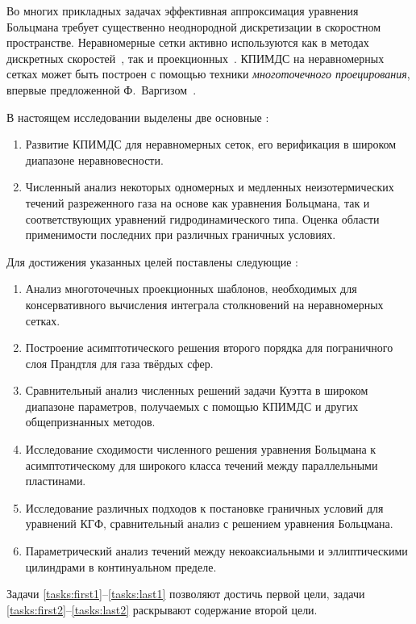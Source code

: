 Во многих прикладных задачах эффективная аппроксимация уравнения Больцмана
требует существенно неоднородной дискретизации в скоростном пространстве.
Неравномерные сетки активно используются
как в методах дискретных скоростей~\autocite{Kolobov2011, Morris2012},
так и проекционных~\autocite{Heintz2008, Wu2014}.
КПИМДС на неравномерных сетках может быть построен с помощью техники \emph{многоточечного проецирования},
впервые предложенной Ф.~Варгизом~\autocite{Varghese2007}.

В настоящем исследовании выделены две основные {\aim}:
\begin{enumerate}
    \item Развитие КПИМДС для неравномерных сеток, его верификация в широком диапазоне неравновесности.
    \item Численный анализ некоторых одномерных и медленных неизотермических течений разреженного газа
    на основе как уравнения Больцмана, так и соответствующих уравнений гидродинамического типа.
    Оценка области применимости последних при различных граничных условиях.
\end{enumerate}
Для достижения указанных целей поставлены следующие {\tasks}:
\begin{enumerate}
    \item Анализ многоточечных проекционных шаблонов, необходимых для консервативного вычисления
    интеграла столкновений на неравномерных сетках.\label{tasks:first1}
    \item Построение асимптотического решения второго порядка
    для пограничного слоя Прандтля для газа твёрдых сфер. \label{tasks:first2}
    \item Сравнительный анализ численных решений задачи Куэтта в широком диапазоне параметров,
    получаемых с помощью КПИМДС и других общепризнанных методов.
    \item Исследование сходимости численного решения уравнения Больцмана к асимптотическому
    для широкого класса течений между параллельными пластинами.
    \item Исследование различных подходов к постановке граничных условий для уравнений КГФ,
    сравнительный анализ с решением уравнения Больцмана.\label{tasks:last1}
    \item Параметрический анализ течений между некоаксиальными и эллиптическими цилиндрами
    в континуальном пределе.\label{tasks:last2}
\end{enumerate}
Задачи \ref{tasks:first1}--\ref{tasks:last1} позволяют достичь первой цели,
задачи \ref{tasks:first2}--\ref{tasks:last2} раскрывают содержание второй цели.

